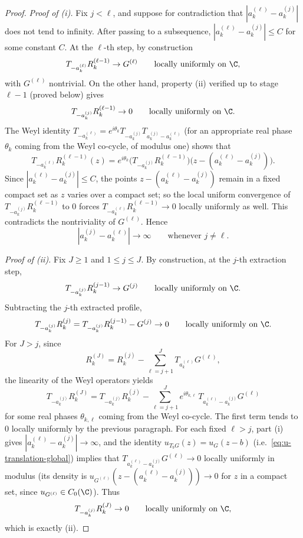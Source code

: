 \begin{proof}
\medskip
\noindent\emph{Proof of (i).}
Fix \(j<\ell\), and suppose for contradiction that
\(|a_k^{(\ell)}-a_k^{(j)}|\) does not tend to infinity. After passing to a
subsequence, \(|a_k^{(\ell)}-a_k^{(j)}|\le C\) for some constant \(C\). At
the \(\ell\)-th step, by construction
\[
T_{-a_k^{(\ell)}}R_k^{(\ell-1)}\to G^{(\ell)}
\qquad\text{locally uniformly on }\C,
\]
with \(G^{(\ell)}\) nontrivial. On the other hand, property (ii) verified up
to stage \(\ell-1\) (proved below) gives
\[
T_{-a_k^{(j)}}R_k^{(\ell-1)}\to 0
\qquad\text{locally uniformly on }\C.
\]
The Weyl identity
\(T_{-a_k^{(\ell)}}=e^{i\theta_k}T_{-a_k^{(j)}}T_{a_k^{(j)}-a_k^{(\ell)}}\)
(for an appropriate real phase \(\theta_k\) coming from the Weyl co-cycle, of
modulus one) shows that
\[
T_{-a_k^{(\ell)}}R_k^{(\ell-1)}(z)
=
e^{i\theta_k}\big(T_{-a_k^{(j)}}R_k^{(\ell-1)}\big)\!
\big(z-(a_k^{(\ell)}-a_k^{(j)})\big).
\]
Since \(|a_k^{(\ell)}-a_k^{(j)}|\le C\), the points
\(z-(a_k^{(\ell)}-a_k^{(j)})\) remain in a fixed compact set as \(z\)
varies over a compact set; so the local uniform convergence of
\(T_{-a_k^{(j)}}R_k^{(\ell-1)}\) to \(0\) forces
\(T_{-a_k^{(\ell)}}R_k^{(\ell-1)}\to 0\) locally uniformly as well.
This contradicts the nontriviality of \(G^{(\ell)}\). Hence
\[
|a_k^{(j)}-a_k^{(\ell)}|\to\infty
\qquad\text{whenever }j\neq \ell.
\]

\medskip
\noindent\emph{Proof of (ii).}
Fix \(J\ge 1\) and \(1\le j\le J\). By construction, at the \(j\)-th
extraction step,
\[
T_{-a_k^{(j)}}R_k^{(j-1)}\to G^{(j)}
\qquad\text{locally uniformly on }\C.
\]
Subtracting the \(j\)-th extracted profile,
\[
T_{-a_k^{(j)}}R_k^{(j)}
=
T_{-a_k^{(j)}}R_k^{(j-1)}-G^{(j)}
\to 0
\qquad\text{locally uniformly on }\C.
\]
For \(J>j\), since
\[
R_k^{(J)}
=
R_k^{(j)}-\sum_{\ell=j+1}^J T_{a_k^{(\ell)}}G^{(\ell)},
\]
the linearity of the Weyl operators yields
\[
T_{-a_k^{(j)}}R_k^{(J)}
=
T_{-a_k^{(j)}}R_k^{(j)}
-\sum_{\ell=j+1}^J e^{i\theta_{k,\ell}}\,T_{a_k^{(\ell)}-a_k^{(j)}}G^{(\ell)}
\]
for some real phases \(\theta_{k,\ell}\) coming from the Weyl co-cycle. The
first term tends to \(0\) locally uniformly by the previous paragraph. For
each fixed \(\ell>j\), part (i) gives \(|a_k^{(\ell)}-a_k^{(j)}|\to\infty\),
and the identity \(u_{T_b G}(z)=u_G(z-b)\) (i.e.\
\eqref{eq:u-translation-global}) implies that
\(T_{a_k^{(\ell)}-a_k^{(j)}}G^{(\ell)}\to 0\) locally uniformly in modulus
(its density is \(u_{G^{(\ell)}}(z-(a_k^{(\ell)}-a_k^{(j)}))\to 0\) for
\(z\) in a compact set, since \(u_{G^{(\ell)}}\in C_0(\C)\)). Thus
\[
T_{-a_k^{(j)}}R_k^{(J)}\to 0
\qquad\text{locally uniformly on }\C,
\]
which is exactly (ii).


\end{proof}
